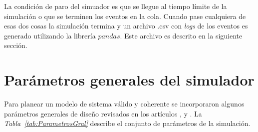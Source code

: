 La condición de paro del simuador es que se llegue al tiempo límite de la simulación o que se terminen los eventos en la cola. Cuando pase cualquiera de esas dos cosas la simulación termina y un archivo .csv con \textit{logs} de los eventos es generado utilizando la librería $pandas$. Este archivo es descrito en la siguiente sección. \newline



\section{Parámetros generales del simulador}\label{parametrossimulador}

Para planear un modelo de sistema válido y coherente se incorporaron algunos parámetros generales de diseño revisados en los artículos \parencite{Shahini2019}, \parencite{Mostafa2019} y \parencite{Gupta2018}. La \textit{Tabla~\ref{tab:ParametrosGral}} describe el conjunto de parámetros de la simulación.\newline

